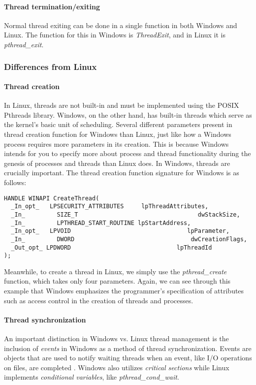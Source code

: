 \documentclass[letterpaper,10pt,titlepage]{article}
\begin{document}
\paragraph{Thread termination/exiting}
Normal thread exiting can be done in a single function in both Windows and Linux. The function for this in Windows is \emph{ThreadExit}, and in Linux it is \emph{pthread\_exit}.

\subsubsection{Differences from Linux}
\paragraph{Thread creation}
In Linux, threads are not built-in and must be implemented using the POSIX Pthreads library. Windows, on the other hand, has built-in threads which serve as the kernel's basic unit of scheduling. Several different parameters present in thread creation function for Windows than Linux, just like how a Windows process requires more parameters in its creation. This is because Windows intends for you to specify more about process and thread functionality during the genesis of processes and threads than Linux does. In Windows, threads are crucially important. The thread creation function signature for Windows is as follows:
\begin{lstlisting}
HANDLE WINAPI CreateThread(
  _In_opt_   LPSECURITY_ATTRIBUTES     lpThreadAttributes,
  _In_         SIZE_T                                  dwStackSize,
  _In_         LPTHREAD_START_ROUTINE lpStartAddress,
  _In_opt_   LPVOID                                 lpParameter,
  _In_         DWORD                                 dwCreationFlags,
  _Out_opt_ LPDWORD                              lpThreadId
);
\end{lstlisting}
Meanwhile, to create a thread in Linux, we simply use the \emph{pthread\_create} function, which takes only four parameters. Again, we can see through this example that Windows emphasizes the programmer's specification of attributes such as access control in the creation of threads and processes.
\paragraph{Thread synchronization}
An important distinction in Windows vs. Linux thread management is the inclusion of \emph{events} in Windows as a method of thread synchronization. Events are objects that are used to notify waiting threads when an event, like I/O operations on files, are completed \cite{rus121}. Windows also utilizes \emph{critical sections} while Linux implements \emph{conditional variables}, like \emph{pthread\_cond\_wait}. 
\end{document}
